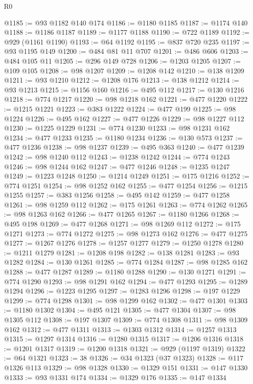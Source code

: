 \begin{lexlean}{R0}
\begin{coremodule}
@1185 := @93 @1182 @140 @174
@1186 := @1180 @1185
@1187 := @1174 @140
@1188 := @1186 @1187
@1189 := @1177 @1188
@1190 := @722 @1189
@1192 := @929 (@1161 @1190)
@1193 := @64 @1192
@1195 := @837 @720 @235
@1197 := @93 @1195 @149
@1200 := @484 @81 @11 @707
@1201 := @486 @606
@1203 := @484 @105 @11
@1205 := @296 @149 @728
@1206 := @1203 @1205
@1207 := @109 @105
@1208 := @98 @1207
@1209 := @1208 @142
@1210 := @138 @1209
@1211 := @93 @1210
@1212 := @1208 @176
@1213 := @138 @1212
@1214 := @93 @1213
@1215 := @1156 @160
@1216 := @495 @112
@1217 := @130 @1216
@1218 := @774 @1217
@1220 := @98 @1218 @162
@1221 := @477 @1220
@1222 := @1215 @1221
@1223 := @383 @1222
@1224 := @477 @199
@1225 := @98 @1224
@1226 := @495 @162
@1227 := @477 @1226
@1229 := @98 @1227 @112
@1230 := @1225 @1229
@1231 := @774 @1230
@1233 := @98 @1231 @162
@1234 := @477 @1233
@1235 := @1180 @1234
@1236 := @130 @573
@1237 := @477 @1236
@1238 := @98 @1237
@1239 := @495 @363
@1240 := @477 @1239
@1242 := @98 @1240 @112
@1243 := @1238 @1242
@1244 := @774 @1243
@1246 := @98 @1244 @162
@1247 := @477 @1246
@1248 := @1235 @1247
@1249 := @1223 @1248
@1250 := @1214 @1249
@1251 := @175 @1216
@1252 := @774 @1251
@1254 := @98 @1252 @162
@1255 := @477 @1254
@1256 := @1215 @1255
@1257 := @383 @1256
@1258 := @495 @142
@1259 := @477 @1258
@1261 := @98 @1259 @112
@1262 := @175 @1261
@1263 := @774 @1262
@1265 := @98 @1263 @162
@1266 := @477 @1265
@1267 := @1180 @1266
@1268 := @495 @198
@1269 := @477 @1268
@1271 := @98 @1269 @112
@1272 := @175 @1271
@1273 := @774 @1272
@1275 := @98 @1273 @162
@1276 := @477 @1275
@1277 := @1267 @1276
@1278 := @1257 @1277
@1279 := @1250 @1278
@1280 := @1211 @1279
@1281 := @1208 @198
@1282 := @138 @1281
@1283 := @93 @1282
@1284 := @130 @1261
@1285 := @774 @1284
@1287 := @98 @1285 @162
@1288 := @477 @1287
@1289 := @1180 @1288
@1290 := @130 @1271
@1291 := @774 @1290
@1293 := @98 @1291 @162
@1294 := @477 @1293
@1295 := @1289 @1294
@1296 := @1223 @1295
@1297 := @1283 @1296
@1298 := @197 @1229
@1299 := @774 @1298
@1301 := @98 @1299 @162
@1302 := @477 @1301
@1303 := @1180 @1302
@1304 := @495 @121
@1305 := @477 @1304
@1307 := @98 @1305 @112
@1308 := @197 @1307
@1309 := @774 @1308
@1311 := @98 @1309 @162
@1312 := @477 @1311
@1313 := @1303 @1312
@1314 := @1257 @1313
@1315 := @1297 @1314
@1316 := @1280 @1315
@1317 := @1206 @1316
@1318 := @1201 @1317
@1319 := @1200 @1318
@1321 := @929 (@1197 @1319)
@1322 := @64 @1321
@1323 := 38
@1326 := @34 @1323 (@37 @1323)
@1328 := @117 @1326 @113
@1329 := @98 @1328
@1330 := @1329 @151
@1331 := @147 @1330
@1333 := @93 @1331 @174
@1334 := @1329 @176
@1335 := @147 @1334

\end{coremodule}
\end{lexlean}
